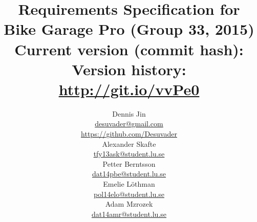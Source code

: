 \title{
	Requirements Specification for Bike Garage Pro (Group 33, 2015)\\
	\vspace{0.2in}
	\normalsize Current version (commit hash): \gitAbbrevHash\\
	\normalsize Version history: \url{http://git.io/vvPe0}
}
\author{
	Dennis Jin\\
	\url{desuvader@gmail.com}\\
	\url{https://github.com/Desuvader}\\
	Alexander Skafte\\
	\url{tfy13ask@student.lu.se}\\
	Petter Berntsson\\
	\url{dat14pbe@student.lu.se}\\
	Emelie Löthman\\
	\url{pol14elo@student.lu.se}\\
	Adam Mzrozek\\
	\url{dat14amr@student.lu.se}
}
\date{}